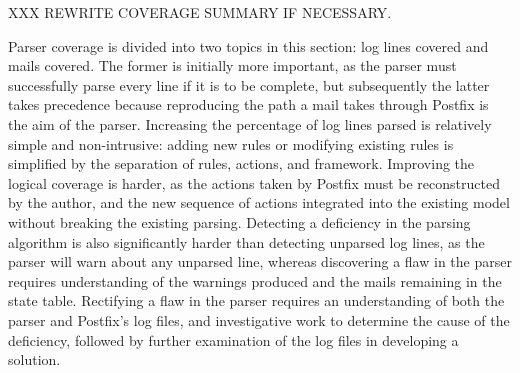XXX REWRITE COVERAGE SUMMARY IF NECESSARY\@.

Parser coverage is divided into two topics in this section: log lines
covered and mails covered.  The former is initially more important, as the
parser must successfully parse every line if it is to be complete, but
subsequently the latter takes precedence because reproducing the path a
mail takes through Postfix is the aim of the parser.  Increasing the
percentage of log lines parsed is relatively simple and non-intrusive:
adding new rules or modifying existing rules is simplified by the
separation of rules, actions, and framework.  Improving the logical
coverage is harder, as the actions taken by Postfix must be reconstructed
by the author, and the new sequence of actions integrated into the existing
model without breaking the existing parsing.  Detecting a deficiency in the
parsing algorithm is also significantly harder than detecting unparsed log
lines, as the parser will warn about any unparsed line, whereas discovering
a flaw in the parser requires understanding of the warnings produced and
the mails remaining in the state table.  Rectifying a flaw in the parser
requires an understanding of both the parser and Postfix's log files, and
investigative work to determine the cause of the deficiency, followed by
further examination of the log files in developing a solution.

